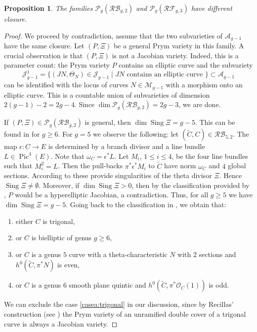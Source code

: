 \documentclass[preprint,12pt]{amsart}
\def\cA{\ensuremath{\mathcal{A}}}
\def\cJ{\ensuremath{\mathcal{J}}}
\def\cM{\ensuremath{\mathcal{M}}}
\def\cO{\ensuremath{\mathcal{O}}}
\def\cP{\ensuremath{\mathcal{P}}}
\def\tC{\ensuremath{\tilde{C}}}
\DeclareMathOperator{\Pic}{Pic}
\theoremstyle{plain}
\newtheorem{proposition}[proposition]{Proposition}
\theoremstyle{definition}
\begin{document}
\begin{proposition}\label{prop:different}
The families $\cP_g(\mathcal {RB}_{g,2})$ and $\cP_g(\mathcal {RF}_{g,3})$ have different closure.
\end{proposition}
\begin{proof}
We proceed by contradiction, assume that the two subvarieties of $\cA_{g-1}$ have the same closure.
Let $(P,\Xi)$ be a general Prym variety in this family.
A crucial observation is that $(P,\Xi)$ is not a Jacobian variety.
Indeed, this is a parameter count: the Prym variety $P$ contains an elliptic curve and the subvariety
\[
\cJ^1_{g-1}=\{(JN,\Theta _N)\in \cJ_{g-1} \mid JN \text{ contains an elliptic curve }\}\subset \cA_{g-1}
\]
can be identified with the locus of curves $N\in\cM_{g-1}$ with a morphism onto an elliptic curve.
This is a countable union of subvarieties of dimension $2(g-1)-2=2g-4$.
Since $\dim \cP_g(\mathcal {RB}_{g,2})=2g-3$, we are done.

If $(P,\Xi)\in \cP_g(\mathcal {RB}_{g,2})$ is general, then $\dim \operatorname{Sing} \Xi =g-5$.
This can be found in \cite[Proposition~5.2.2]{De} %
for $g\ge 6$.
For $g=5$ we observe the following: let $(\tC,C)\in \mathcal {RB}_{5,2}$. The map $\epsilon \colon C\to E$ is determined by a  branch divisor and a line bundle $L\in \Pic^4(E)$. Note that $\omega_C=\epsilon^*L$. 
Let $M_i$, $1\le i\le 4$, be the four line bundles such that $M_i^2=L$.
Then the pull-backs $\pi^*\epsilon^*M_i$ to $\tC$ have norm $\omega_C$ and $4$ global sections.
According to \cite{M} these provide singularities of the theta divisor $\Xi$.
Hence $\operatorname{Sing} \Xi  \neq \emptyset$. Moreover, if $\dim \operatorname{Sing} \Xi >0$, then by  
the classification provided by \cite[Theorem~4.10]{be}, $P$ would be a hyperelliptic Jacobian, a contradiction. Thus, for all $g\ge 5$ we have 
$\dim \operatorname{Sing} \Xi =g-5$. Going back to the classification in \cite[Theorem~4.10]{be}, we obtain that:
\begin{enumerate}
\item\label{casea:trigonal} either $C$ is trigonal,
\item\label{caseb:bielliptic} or $C$ is bielliptic of genus $g\ge 6$,
\item\label{casec:nullvierte} or $C$ is a genus $5$ curve with a theta-characteristic $N$ with $2$ sections and $h^0(\tilde C,\pi^*N)$ is even,
\item\label{cased:planequintic} or $C$ is a genus $6$ smooth plane quintic and $h^0(\tilde C, \pi^*\cO_C(1))$ is odd.
\end{enumerate}
We can exclude the case \eqref{casea:trigonal} in our discussion, since by Recillas' construction (see \cite[\S2.4]{do_fibres}) the Prym variety of an unramified double cover of a trigonal curve is always a Jacobian variety.


\end{proof}
\end{document}
